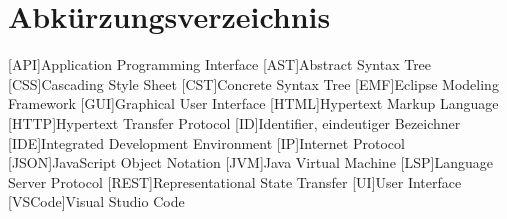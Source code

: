 \chapter*{Abkürzungsverzeichnis}


\begin{acronym}[XXXXXX]
    [API]{Application Programming Interface}
    [AST]{Abstract Syntax Tree}
    [CSS]{Cascading Style Sheet}
    [CST]{Concrete Syntax Tree}
    [EMF]{Eclipse Modeling Framework}
    [GUI]{Graphical User Interface}
    [HTML]{Hypertext Markup Language}
    [HTTP]{Hypertext Transfer Protocol}
    [ID]{Identifier, eindeutiger Bezeichner}
    [IDE]{Integrated Development Environment}
    [IP]{Internet Protocol}
    [JSON]{JavaScript Object Notation}
    [JVM]{Java Virtual Machine}
    [LSP]{Language Server Protocol}
    [REST]{Representational State Transfer}
    [UI]{User Interface}
    [VSCode]{Visual Studio Code}
\end{acronym}

